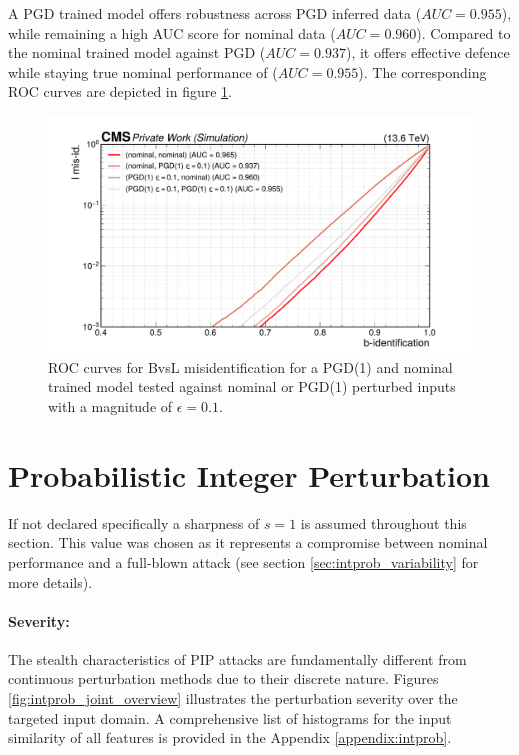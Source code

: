 A PGD trained model offers robustness across PGD inferred data ($AUC=0.955$), while remaining a high AUC score for nominal data ($AUC=0.960$). Compared to the nominal trained model against PGD ($AUC=0.937$), it offers effective defence while staying true nominal performance of ($AUC=0.955$). The corresponding ROC curves are depicted in figure \ref{fig:pgd_trained}. 

\begin{figure}[h]
\centering
    \includegraphics[width=15cm]{media/output/roc_bvsl_pgd_perms.pdf}
    \caption{ROC curves for BvsL misidentification for a PGD(1) and nominal trained model tested against nominal or PGD(1) perturbed inputs with a magnitude of $\epsilon=0.1$.}
    \label{fig:pgd_trained}
\end{figure}

\FloatBarrier
\section{Probabilistic Integer Perturbation}
\label{sec:inprob_result}

If not declared specifically a sharpness of $s=1$ is assumed throughout this section. This value was chosen as it represents a compromise between nominal performance and a full-blown attack (see section \ref{sec:intprob_variability} for more details).

\paragraph{Severity:} The stealth characteristics of PIP attacks are fundamentally different from continuous perturbation methods due to their discrete nature. Figures \ref{fig:intprob_joint_overview} illustrates the perturbation severity over the targeted input domain. A comprehensive list of histograms for the input similarity of all features is provided in the Appendix \ref{appendix:intprob}.

